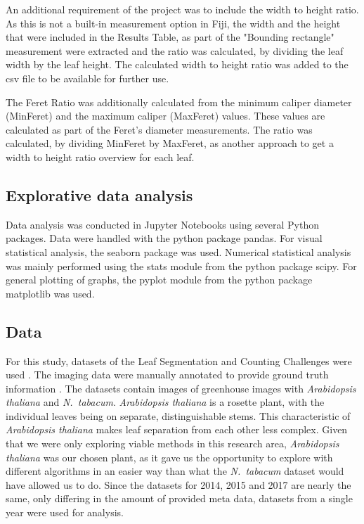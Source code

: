 \documentclass[paper=A4,bibliography=totocnumbered]{scrartcl}
\begin{document}
An additional requirement of the project was to include the width to height ratio. As this is not a built-in measurement option in Fiji, the width and the height that were included in the Results Table, as part of the "Bounding rectangle" measurement were extracted and the ratio was calculated, by dividing the leaf width by the leaf height. The calculated width to height ratio was added to the csv file to be available for further use.

The Feret Ratio was additionally calculated from the minimum caliper diameter (MinFeret) and the maximum caliper (MaxFeret) values. These values are calculated as part of the Feret's diameter measurements. The ratio was calculated, by dividing MinFeret by MaxFeret, as another approach to get a width to height ratio overview for each leaf.

\subsection{Explorative data analysis}
Data analysis was conducted in Jupyter Notebooks using several Python packages. Data were handled with the python package pandas. For visual statistical analysis, the seaborn package was used. Numerical statistical analysis was mainly performed using the stats module from the python package scipy. For general plotting of graphs, the pyplot module from the python package matplotlib was used.

\subsection{Data}
For this study, datasets of the Leaf Segmentation and Counting Challenges were used \citep{Minervini.2016}. The imaging data were manually annotated to provide ground truth information \citep{Scharr.2014}. The datasets contain images of greenhouse images with \textit{Arabidopsis thaliana} and \textit{N.~tabacum}. \textit{Arabidopsis thaliana} is a rosette plant, with the individual leaves being on separate, distinguishable stems. This characteristic of \textit{Arabidopsis thaliana} makes leaf separation from each other less complex.  Given that we were only exploring viable methods in this research area, \textit{Arabidopsis thaliana} was our chosen plant, as it gave us the opportunity to explore with different algorithms in an easier way than what the \textit{N.~tabacum} dataset would have allowed us to do. Since the datasets for 2014, 2015 and 2017 are nearly the same, only differing in the amount of provided meta data, datasets from a single year were used for analysis. 
\end{document}

